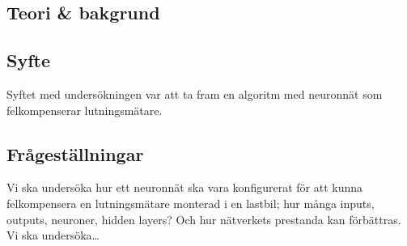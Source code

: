\subsection{Teori \& bakgrund}

\subsection{Syfte}
Syftet med  undersökningen var att ta fram en algoritm med neuronnät som
felkompenserar lutningsmätare.

\subsection{Frågeställningar}
Vi ska undersöka hur ett neuronnät ska vara konfigurerat för att kunna
felkompensera en lutningsmätare monterad i en lastbil; hur många inputs,
outputs, neuroner, hidden layers? Och hur nätverkets prestanda kan förbättras.
Vi ska undersöka\ldots
